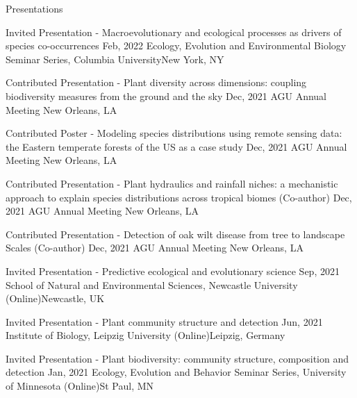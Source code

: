 \documentclass{resume} %
\begin{document}
\begin{rSection}{Presentations}
\begin{sSubsection}{Invited Presentation - Macroevolutionary and ecological processes as drivers of species co-occurrences}{ \hfill }{Feb, 2022}{ Ecology, Evolution and Environmental Biology Seminar Series, Columbia University}{New York, NY}
\end{sSubsection}

\begin{sSubsection}{Contributed Presentation - Plant diversity across dimensions: coupling biodiversity measures from the ground and the sky}{ \hfill }{Dec, 2021}{ AGU Annual Meeting }{New Orleans, LA}
\end{sSubsection}

\begin{sSubsection}{Contributed Poster - Modeling species distributions using remote sensing data: the Eastern temperate forests of the US as a case study}{ }{Dec, 2021}{ AGU Annual Meeting }{New Orleans, LA}
\end{sSubsection}

\begin{sSubsection}{Contributed Presentation - Plant hydraulics and rainfall niches: a mechanistic approach to explain species distributions across tropical biomes}{ (Co-author) }{Dec, 2021}{ AGU Annual Meeting }{New Orleans, LA}
\end{sSubsection}

\begin{sSubsection}{Contributed Presentation - Detection of oak wilt disease from tree to landscape Scales}{ (Co-author) }{Dec, 2021}{ AGU Annual Meeting }{New Orleans, LA}
\end{sSubsection}

\begin{sSubsection}{Invited Presentation - Predictive ecological and evolutionary science}{ }{Sep, 2021}{ School of Natural and Environmental Sciences, Newcastle University (Online)}{Newcastle, UK}
\end{sSubsection}

\begin{sSubsection}{Invited Presentation - Plant community structure and detection}{ }{Jun, 2021}{ Institute of Biology, Leipzig University (Online)}{Leipzig, Germany}
\end{sSubsection}

\begin{sSubsection}{Invited Presentation - Plant biodiversity: community structure, composition and detection}{ }{Jan, 2021}{ Ecology, Evolution and Behavior Seminar Series, University of Minnesota (Online)}{St Paul, MN}
\end{sSubsection}


\end{rSection}
\end{document}
